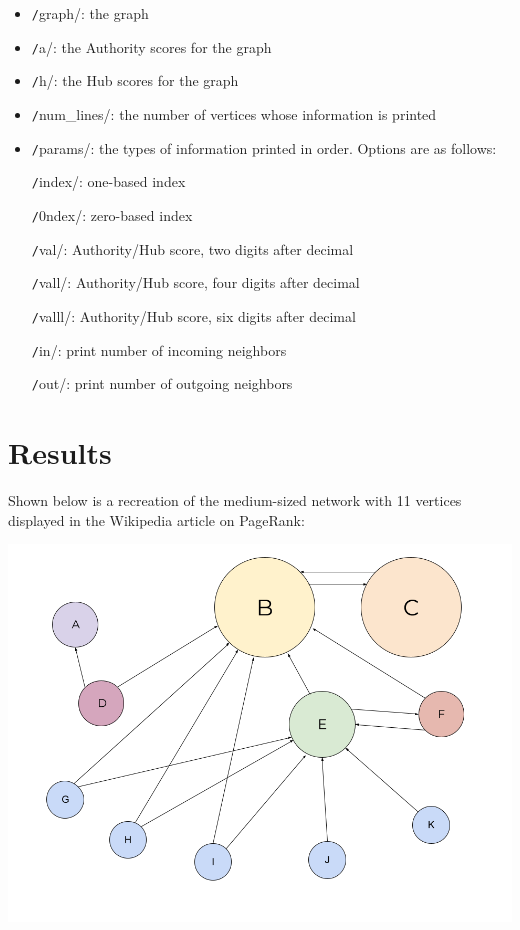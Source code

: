 \documentclass[12pt, titlepage, twoside]{amsart}
\begin{document}
\begin{itemize}[label={}]
\item \texttt/graph/: the graph

\item \texttt/a/: the Authority scores for the graph

\item \texttt/h/: the Hub scores for the graph

\item \texttt/num_lines/: the number of vertices whose information is printed

\item \texttt/params/: the types of information printed in order. Options are as follows:

\texttt/index/: one-based index

\texttt/0ndex/: zero-based index

\texttt/val/: Authority/Hub score, two digits after decimal

\texttt/vall/: Authority/Hub score, four digits after decimal

\texttt/valll/: Authority/Hub score, six digits after decimal

\texttt/in/: print number of incoming neighbors

\texttt/out/: print number of outgoing neighbors
\end{itemize}

\section{Results}

Shown below is a recreation of the medium-sized network with 11 vertices displayed in
the Wikipedia article on PageRank:

\includegraphics[width=\textwidth]{Wikipedia_Medium-graph.png}
\end{document}

